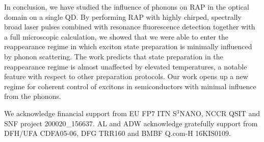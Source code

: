 \documentclass[aps,prl,reprint,superscriptaddress]{revtex4-1}
\begin{document}
In conclusion, we have studied the influence of phonons on RAP in the optical domain on a single QD. By performing RAP with highly chirped, spectrally broad laser pulses combined with resonance fluorescence detection together with a full microscopic calculation, we showed that we were able to enter the reappearance regime in which exciton state preparation is minimally influenced by phonon scattering. The work predicts that state preparation in the reappearance regime is almost unaffected by elevated temperatures, a notable feature with respect to other preparation protocols. Our work opens up a new regime for coherent control of excitons in semiconductors with minimal influence from the phonons. 

\begin{acknowledgments}
We acknowledge financial support from EU FP7 ITN S$^{3}$NANO, NCCR QSIT and SNF project 200020\_156637. AL and ADW acknowledge gratefully support from DFH/UFA CDFA05-06, DFG TRR160 and BMBF Q.com-H 16KIS0109.
\end{acknowledgments}




%

%
\end{document}
